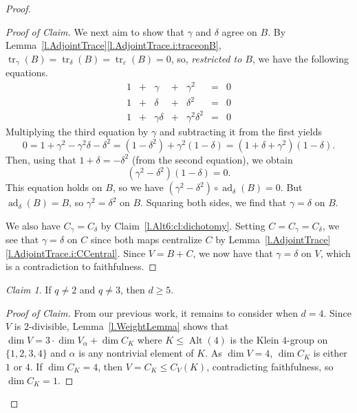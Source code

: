 \documentclass[a4paper, 11pt]{amsart}
\theoremstyle{plain}
\theoremstyle{definition}
\theoremstyle{remark}
\newtheorem{claim}{Claim}
\newenvironment{proofclaim}[1][Proof of Claim]{\begin{proof}[#1]\renewcommand{\qedsymbol}{$\lozenge$}}{\end{proof}}
\DeclareMathOperator{\ad}{ad}
\DeclareMathOperator{\tr}{tr}
\DeclareMathOperator{\Alt}{Alt}
\begin{document}
\begin{proof}
\begin{proofclaim}
We  next aim  to show that $\gamma$ and $\delta$ agree on $B$. By Lemma~\ref{l.AdjointTrace}\eqref{l.AdjointTrace.i:traceonB}, $\tr_\gamma(B) = \tr_\delta(B) = \tr_\varepsilon(B) = 0$, so, \emph{restricted to $B$}, we have the following equations.
\[\begin{array}{ccccccc}
    1 & + & \gamma & + & \gamma^2 & = & 0\\
    1 & + & \delta & + & \delta^2 & = & 0\\
    1 & + & \gamma\delta & + & \gamma^2\delta^2 & = & 0
\end{array}\]
Multiplying the third equation by $\gamma$ and subtracting it from the first yields
\[
    0 = 1 + \gamma^2 - \gamma^2\delta - \delta^2
    = (1-\delta^2) + \gamma^2(1-\delta)
    = (1+\delta + \gamma^2)(1-\delta).
\]
Then, using that $1 + \delta = - \delta^2$ (from the second equation), we obtain 
\[(\gamma^2 -\delta^2)(1-\delta) = 0.\]
This equation holds on $B$, so we have $(\gamma^2 -\delta^2)\circ\ad_\delta(B) = 0$.
But $\ad_\delta (B) = B$,
so $\gamma^2 = \delta^2$ on $B$. Squaring both sides, we find that $\gamma=\delta$ on $B$.

We also have  $C_\gamma = C_\delta$ by Claim~\ref{l.Alt6:cl:dichotomy}.  Setting $C= C_\gamma = C_\delta$, we see that $\gamma=\delta$ on $C$ since both maps centralize $C$ by Lemma~\ref{l.AdjointTrace}\eqref{l.AdjointTrace.i:CCentral}. Since $V=B + C$, we now have that $\gamma=\delta$ on $V$, which is a contradiction to faithfulness.
\end{proofclaim}

\begin{claim}\label{l.Alt6:cl:dAtLeast5}
If $q\ne 2$ and $q\ne 3$, then $d \ge 5$.  
\end{claim}
\begin{proofclaim}
From our previous work, it remains to consider when $d = 4$. Since $V$ is $2$-divisible, Lemma~\ref{l.WeightLemma} shows that $\dim V=3\cdot\dim V_{\alpha}+\dim C_{K}$ where $K\le \Alt(4)$ is the Klein $4$-group on $\{1, 2, 3, 4\}$ and $\alpha$ is any nontrivial element of $K$. As $\dim V = 4$, $\dim C_{K}$ is either $1$ or $4$. If $\dim C_{K} = 4$, then $V = C_{K} \le C_V(K)$, contradicting faithfulness, so  $\dim C_{K} = 1$. 


\end{proofclaim}
\end{proof}
\end{document}
